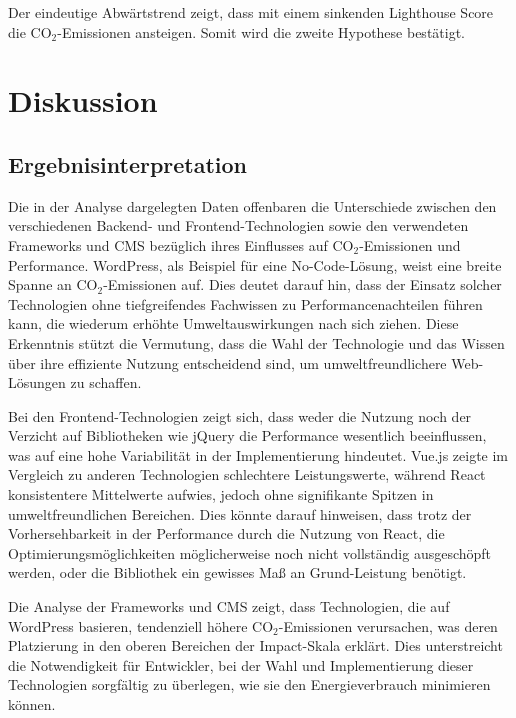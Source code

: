 \documentclass[Bachelor,BIF,german,IEEE]{BASE/twbook}
\begin{document}
\noindent Der eindeutige Abwärtstrend zeigt, dass mit einem sinkenden Lighthouse Score die CO$_2$-Emissionen ansteigen. Somit wird die zweite Hypothese bestätigt.

\clearpage


\chapter{Diskussion}

\section{Ergebnisinterpretation}

Die in der Analyse dargelegten Daten offenbaren die Unterschiede zwischen den verschiedenen Backend- und Frontend-Technologien sowie den verwendeten Frameworks und \ac{CMS} bezüglich ihres Einflusses auf CO$_2$-Emissionen und Performance. WordPress, als Beispiel für eine No-Code-Lösung, weist eine breite Spanne an CO$_2$-Emissionen auf. Dies deutet darauf hin, dass der Einsatz solcher Technologien ohne tiefgreifendes Fachwissen zu Performancenachteilen führen kann, die wiederum erhöhte Umweltauswirkungen nach sich ziehen. Diese Erkenntnis stützt die Vermutung, dass die Wahl der Technologie und das Wissen über ihre effiziente Nutzung entscheidend sind, um umweltfreundlichere Web-Lösungen zu schaffen.\newline

\noindent Bei den Frontend-Technologien zeigt sich, dass weder die Nutzung noch der Verzicht auf Bibliotheken wie jQuery die Performance wesentlich beeinflussen, was auf eine hohe Variabilität in der Implementierung hindeutet. Vue.js zeigte im Vergleich zu anderen Technologien schlechtere Leistungswerte, während React konsistentere Mittelwerte aufwies, jedoch ohne signifikante Spitzen in umweltfreundlichen Bereichen. Dies könnte darauf hinweisen, dass trotz der Vorhersehbarkeit in der Performance durch die Nutzung von React, die Optimierungsmöglichkeiten möglicherweise noch nicht vollständig ausgeschöpft werden, oder die Bibliothek ein gewisses Maß an Grund-Leistung benötigt.\newline

\noindent Die Analyse der Frameworks und \ac{CMS} zeigt, dass Technologien, die auf WordPress basieren, tendenziell höhere CO$_2$-Emissionen verursachen, was deren Platzierung in den oberen Bereichen der Impact-Skala erklärt. Dies unterstreicht die Notwendigkeit für Entwickler, bei der Wahl und Implementierung dieser Technologien sorgfältig zu überlegen, wie sie den Energieverbrauch minimieren können.
\end{document}
